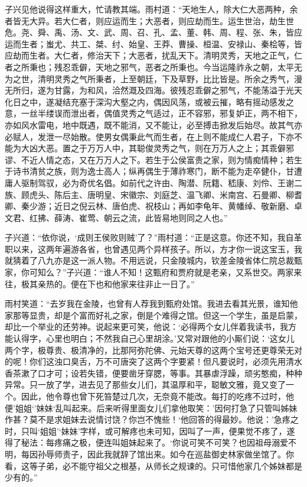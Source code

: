 \documentclass[12pt,oneside]{book}
\begin{document}
子兴见他说得这样重大，忙请教其端。雨村道：“天地生人，除大仁大恶两种，余者皆无大异。若大仁者，则应运而生；大恶者，则应劫而生。运生世治，劫生世危。尧、舜、禹、汤、文、武、周、召、孔、孟、董、韩、周、程、张、朱，皆应运而生者；蚩尤、共工、桀、纣、始皇、王莽、曹操、桓温、安禄山、秦桧等，皆应劫而生者。大仁者，修治天下；大恶者，扰乱天下。清明灵秀，天地之正气，仁者之所秉也；残忍乖僻，天地之邪气，恶者之所秉也。今当运隆祚永之朝，太平无为之世，清明灵秀之气所秉者，上至朝廷，下及草野，比比皆是。所余之秀气，漫无所归，遂为甘露，为和风，洽然溉及四海。彼残忍乖僻之邪气，不能荡溢于光天化日之中，遂凝结充塞于深沟大壑之内，偶因风荡，或被云摧，略有摇动感发之意，一丝半缕误而泄出者，偶值灵秀之气适过，正不容邪，邪复妒正，两不相下，亦如风水雷电，地中既遇，既不能消，又不能让，必至搏击掀发后始尽。故其气亦必赋人，发泄一尽始散。使男女偶秉此气而生者，在上则不能成仁人君子，下亦不能为大凶大恶。置之于万万人中，其聪俊灵秀之气，则在万万人之上；其乖僻邪谬、不近人情之态，又在万万人之下。若生于公侯富贵之家，则为情痴情种；若生于诗书清贫之族，则为逸士高人；纵再偶生于薄祚寒门，断不能为走卒健仆，甘遭庸人驱制驾驭，必为奇优名倡。如前代之许由、陶潜、阮籍、嵇康、刘伶、王谢二族、顾虎头、陈后主、唐明皇、宋徽宗、刘庭芝、温飞卿、米南宫、石曼卿、柳耆卿、秦少游；近日之倪云林、唐伯虎、祝枝山；再如李龟年、黄幡绰、敬新磨、卓文君、红拂、薛涛、崔莺、朝云之流，此皆易地则同之人也。”

子兴道：“依你说，‘成则王侯败则贼’了？”雨村道：“正是这意。你还不知，我自革职以来，这两年遍游各省，也曾遇见两个异样孩子。所以，方才你一说这宝玉，我就猜着了八九亦是这一派人物。不用远说，只金陵城内，钦差金陵省体仁院总裁甄家，你可知么？”子兴道：“谁人不知！这甄府和贾府就是老亲，又系世交。两家来往，极其亲热的。便在下也和他家来往非止一日了。”

雨村笑道：“去岁我在金陵，也曾有人荐我到甄府处馆。我进去看其光景，谁知他家那等显贵，却是个富而好礼之家，倒是个难得之馆。但这一个学生，虽是启蒙，却比一个举业的还劳神。说起来更可笑，他说：‘必得两个女儿伴着我读书，我方能认得字，心里也明白；不然我自己心里胡涂。’又常对跟他的小厮们说：‘这女儿两个字，极尊贵、极清净的，比那阿弥陀佛、元始天尊的这两个宝号还更尊荣无对的呢！你们这浊口臭舌，万不可唐突了这两个字要紧！但凡要说时，必须先用清水香茶漱了口才可；设若失错，便要凿牙穿腮，等事。其暴虐浮躁，顽劣憨痴，种种异常。只一放了学，进去见了那些女儿们，其温厚和平，聪敏文雅，竟又变了一个。因此，他令尊也曾下死笞楚过几次，无奈竟不能改。每打的吃疼不过时，他便’姐姐‘’妹妹‘乱叫起来。后来听得里面女儿们拿他取笑：’因何打急了只管叫姊妹作甚？莫不是求姐妹去说情讨饶？你岂不愧些！‘他回答的得最妙。他说：’急疼之时，只叫‘姐姐’‘妹妹’字样，或可解疼也未可知，因叫了一声，便果觉不疼了，遂得了秘法：每疼痛之极，便连叫姐妹起来了。‘你说可笑不可笑？也因祖母溺爱不明，每因孙辱师责子，因此我就辞了馆出来。如今在巡盐御史林家做坐馆了。你看，这等子弟，必不能守祖父之根基，从师长之规谏的。只可惜他家几个姊妹都是少有的。”
\end{document}
